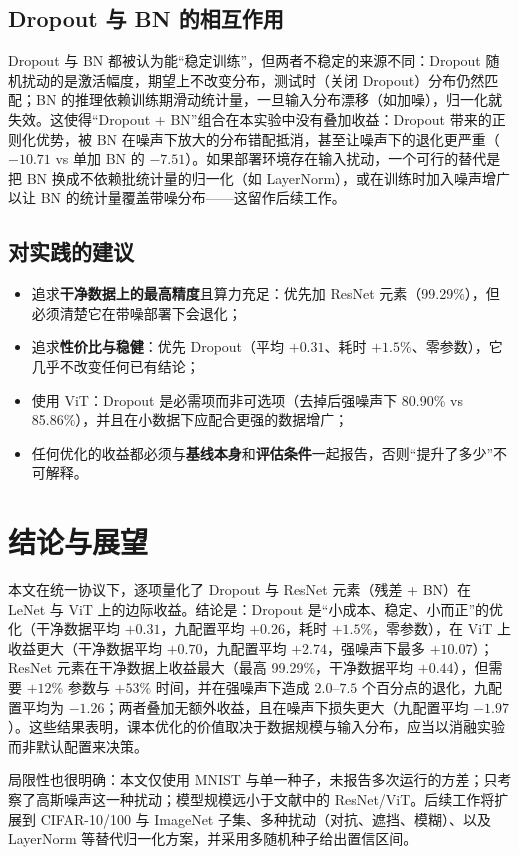 \documentclass[12pt,hyperref,a4paper,UTF8]{ctexart}
\begin{document}
\subsection{Dropout 与 BN 的相互作用}
Dropout 与 BN 都被认为能“稳定训练”，但两者不稳定的来源不同：Dropout 随机扰动的是激活幅度，期望上不改变分布，测试时（关闭 Dropout）分布仍然匹配；BN 的推理依赖训练期滑动统计量，一旦输入分布漂移（如加噪），归一化就失效。这使得“Dropout + BN”组合在本实验中没有叠加收益：Dropout 带来的正则化优势，被 BN 在噪声下放大的分布错配抵消，甚至让噪声下的退化更严重（$-10.71$ vs 单加 BN 的 $-7.51$）。如果部署环境存在输入扰动，一个可行的替代是把 BN 换成不依赖批统计量的归一化（如 LayerNorm），或在训练时加入噪声增广以让 BN 的统计量覆盖带噪分布——这留作后续工作。

\subsection{对实践的建议}
\begin{itemize}
    \item 追求\textbf{干净数据上的最高精度}且算力充足：优先加 ResNet 元素（99.29\%），但必须清楚它在带噪部署下会退化；
    \item 追求\textbf{性价比与稳健}：优先 Dropout（平均 $+0.31$、耗时 $+1.5\%$、零参数），它几乎不改变任何已有结论；
    \item 使用 ViT：Dropout 是必需项而非可选项（去掉后强噪声下 80.90\% vs 85.86\%），并且在小数据下应配合更强的数据增广；
    \item 任何优化的收益都必须与\textbf{基线本身}和\textbf{评估条件}一起报告，否则“提升了多少”不可解释。
\end{itemize}

\section{结论与展望}

本文在统一协议下，逐项量化了 Dropout 与 ResNet 元素（残差 + BN）在 LeNet 与 ViT 上的边际收益。结论是：Dropout 是“小成本、稳定、小而正”的优化（干净数据平均 $+0.31$，九配置平均 $+0.26$，耗时 $+1.5\%$，零参数），在 ViT 上收益更大（干净数据平均 $+0.70$，九配置平均 $+2.74$，强噪声下最多 $+10.07$）；ResNet 元素在干净数据上收益最大（最高 99.29\%，干净数据平均 $+0.44$），但需要 $+12\%$ 参数与 $+53\%$ 时间，并在强噪声下造成 $2.0$--$7.5$ 个百分点的退化，九配置平均为 $-1.26$；两者叠加无额外收益，且在噪声下损失更大（九配置平均 $-1.97$）。这些结果表明，课本优化的价值取决于数据规模与输入分布，应当以消融实验而非默认配置来决策。

局限性也很明确：本文仅使用 MNIST 与单一种子，未报告多次运行的方差；只考察了高斯噪声这一种扰动；模型规模远小于文献中的 ResNet/ViT。后续工作将扩展到 CIFAR-10/100 与 ImageNet 子集、多种扰动（对抗、遮挡、模糊）、以及 LayerNorm 等替代归一化方案，并采用多随机种子给出置信区间。


\end{document}
